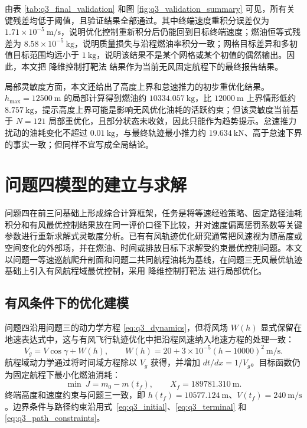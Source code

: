 \documentclass[withoutpreface,bwprint]{cumcmthesis}
\begin{document}
由表 \ref{tab:q3_final_validation} 和图 \ref{fig:q3_validation_summary} 可见，所有关键残差均低于阈值，且验证结果全部通过。其中终端速度重积分误差仅为 $1.71\times10^{-5}\ \mathrm{m/s}$，说明优化控制重新积分后仍能回到目标终端速度；燃油恒等式残差为 $8.58\times10^{-5}\ \mathrm{kg}$，说明质量损失与沿程燃油率积分一致；网格目标差异和多初值目标范围均远小于 $1\ \mathrm{kg}$，说明该结果不是某个网格或某个初值的偶然输出。因此，本文把 降维控制打靶法 结果作为当前无风固定航程下的最终报告结果。

局部灵敏度方面，本文还给出了高度上界和怠速推力的初步重优化结果。$h_{\max}=12500\ \mathrm{m}$ 的局部计算得到燃油约 $10334.057\ \mathrm{kg}$，比 $12000\ \mathrm{m}$ 上界情形低约 $8.757\ \mathrm{kg}$，提示高度上界可能是影响无风优化油耗的活跃约束；但该灵敏度当前基于 $N=121$ 局部重优化，且部分状态未收敛，因此只能作为趋势提示。怠速推力扰动的油耗变化不超过 $0.01\ \mathrm{kg}$，与最终轨迹最小推力约 $19.634\ \mathrm{kN}$、高于怠速下界的事实一致；但同样不宜写成全局结论。

\section{问题四模型的建立与求解}

问题四在前三问基础上形成综合计算框架，任务是将等速经验策略、固定路径油耗积分和有风最优控制结果放在同一评价口径下比较，并对速度偏离惩罚系数等关键参数进行重新求解式灵敏度分析。已有有风轨迹优化研究通常把风速视为随高度或空间变化的外部场，并在燃油、时间或排放目标下求解受约束最优控制问题\cite{chang2023,jia2024}。本文以问题一等速巡航爬升剖面和问题二共同航程油耗为基线，在问题三无风最优轨迹基础上引入有风航程域最优控制，采用 降维控制打靶法 进行局部优化。

\subsection{有风条件下的优化建模}

问题四沿用问题三的动力学方程 \eqref{eq:q3_dynamics}，但将风场 $W(h)$ 显式保留在地速表达式中，这与有风飞行轨迹优化中把沿程风速纳入地速方程的处理一致\cite{chang2023,jia2024}：
\begin{equation}
V_g=V\cos\gamma+W(h),\qquad W(h)=20+3\times 10^{-5}(h-10000)^2\ \mathrm{m/s}.
\label{eq:q4_wind}
\end{equation}
航程域动力学通过将时间域方程除以 $V_g$ 获得，并增加 $dt/dx=1/V_g$。目标函数仍为固定航程下最小化燃油消耗：
\begin{equation}
\min\ J=m_0-m(t_f),\qquad X_f=189781.310\ \mathrm{m}.
\label{eq:q4_objective}
\end{equation}
终端高度和速度约束与问题三一致，即 $h(t_f)=10577.124\ \mathrm{m}$、$V(t_f)=240\ \mathrm{m/s}$。边界条件与路径约束沿用式~\eqref{eq:q3_initial}、\eqref{eq:q3_terminal} 和 \eqref{eq:q3_path_constraints}。
\end{document}
